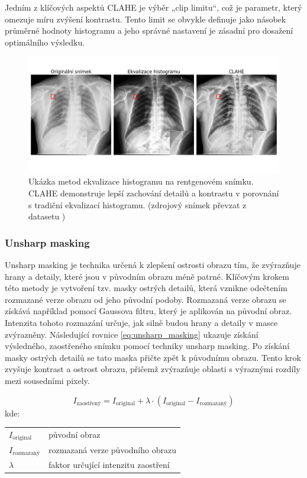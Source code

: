 \documentclass[male,czech,api_ing]{thesis}
\makeatletter
\newenvironment{conditions}[1][kde:]
    {#1 \begin{tabular}[t]{>{$}l<{$} @{${}={}$} >{\raggedright\arraybackslash}p{10cm}}}
    {\end{tabular}}
\makeatother
\begin{document}
Jedním z klíčových aspektů CLAHE je výběr „clip limitu“, což je parametr, který omezuje míru zvýšení kontrastu. Tento limit se obvykle definuje jako násobek průměrné hodnoty histogramu a jeho správné nastavení je zásadní pro dosažení optimálního výsledku. \cite{GraphicsGems}

\begin{figure}[ht]
    \centering
    \includegraphics[width=\linewidth]{Prilohy/Obrazky/ImageEnhancement.png}
    \caption{Ukázka metod ekvalizace histogramu na rentgenovém snímku. CLAHE demonstruje lepší zachování detailů a kontrastu v porovnání s tradiční ekvalizací histogramu. (zdrojový snímek převzat z datasetu \cite{LungDataset})}
    \label{fig:histogram_equalization}
\end{figure}

\subsubsection{Unsharp masking}
Unsharp masking je technika určená k zlepšení ostrosti obrazu tím, že zvýrazňuje hrany a detaily, které jsou v původním obrazu méně patrné. Klíčovým krokem této metody je vytvoření tzv. masky ostrých detailů, která vznikne odečtením rozmazané verze obrazu od jeho původní podoby. Rozmazaná verze obrazu se získává například pomocí Gaussova filtru, který je aplikován na původní obraz. Intenzita tohoto rozmazání určuje, jak silně budou hrany a detaily v masce zvýrazněny. Následující rovnice \ref{eq:unsharp_masking} ukazuje získání výsledného, zaostřeného snímku pomocí techniky unsharp masking. Po získání masky ostrých detailů se tato maska přičte zpět k původnímu obrazu. Tento krok zvyšuje kontrast a ostrost obrazu, přičemž zvýrazňuje oblasti s výraznými rozdíly mezi sousedními pixely. \cite{UnsharpMasking}

\begin{equation}
    I_{\text{zaostřený}} = I_{\text{original}} + \lambda \cdot (I_{\text{original}} - I_{\text{rozmazaný}})
    \label{eq:unsharp_masking}
\end{equation}
\begin{conditions}
    I_{\text{original}} & původní obraz \\
    I_{\text{rozmazaný}} & rozmazaná verze původního obrazu \\
    \lambda & faktor určující intenzitu zaostření
\end{conditions}
\end{document}
